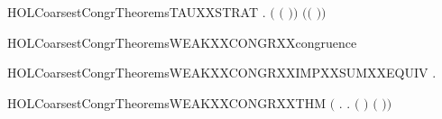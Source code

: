\newcommand{\HOLCoarsestCongrTheoremsPROPThreeXXCOMMON}{\UseVerbatim{HOLCoarsestCongrTheoremsPROPThreeXXCOMMON}}
\begin{SaveVerbatim}{HOLCoarsestCongrTheoremsTAUXXSTRAT}
\HOLTokenTurnstile{} \HOLSymConst{\HOLTokenForall{}} .  \ensuremath{(} \HOLSymConst{\ensuremath{+}} \HOLConst{\ensuremath{\tau}}\HOLSymConst{\ensuremath{\ldotp}}\ensuremath{(} \HOLSymConst{\ensuremath{+}} \ensuremath{)}\ensuremath{)} \ensuremath{(}\HOLConst{\ensuremath{\tau}}\HOLSymConst{\ensuremath{\ldotp}}\ensuremath{(} \HOLSymConst{\ensuremath{+}} \ensuremath{)}\ensuremath{)}
\end{SaveVerbatim}
\newcommand{\HOLCoarsestCongrTheoremsTAUXXSTRAT}{\UseVerbatim{HOLCoarsestCongrTheoremsTAUXXSTRAT}}
\begin{SaveVerbatim}{HOLCoarsestCongrTheoremsWEAKXXCONGRXXcongruence}
\HOLTokenTurnstile{}  
\end{SaveVerbatim}
\newcommand{\HOLCoarsestCongrTheoremsWEAKXXCONGRXXcongruence}{\UseVerbatim{HOLCoarsestCongrTheoremsWEAKXXCONGRXXcongruence}}
\begin{SaveVerbatim}{HOLCoarsestCongrTheoremsWEAKXXCONGRXXIMPXXSUMXXEQUIV}
\HOLTokenTurnstile{} \HOLSymConst{\HOLTokenForall{}} .    \HOLSymConst{\HOLTokenImp{}}   
\end{SaveVerbatim}
\newcommand{\HOLCoarsestCongrTheoremsWEAKXXCONGRXXIMPXXSUMXXEQUIV}{\UseVerbatim{HOLCoarsestCongrTheoremsWEAKXXCONGRXXIMPXXSUMXXEQUIV}}
\begin{SaveVerbatim}{HOLCoarsestCongrTheoremsWEAKXXCONGRXXTHM}
\HOLTokenTurnstile{}  \HOLSymConst{\ensuremath{=}} \ensuremath{(}\HOLTokenLambda{} . \HOLSymConst{\HOLTokenForall{}}.   \HOLSymConst{\HOLTokenImp{}}  \ensuremath{(} \ensuremath{)} \ensuremath{(} \ensuremath{)}\ensuremath{)}
\end{SaveVerbatim}
\newcommand{\HOLCoarsestCongrTheoremsWEAKXXCONGRXXTHM}{\UseVerbatim{HOLCoarsestCongrTheoremsWEAKXXCONGRXXTHM}}
